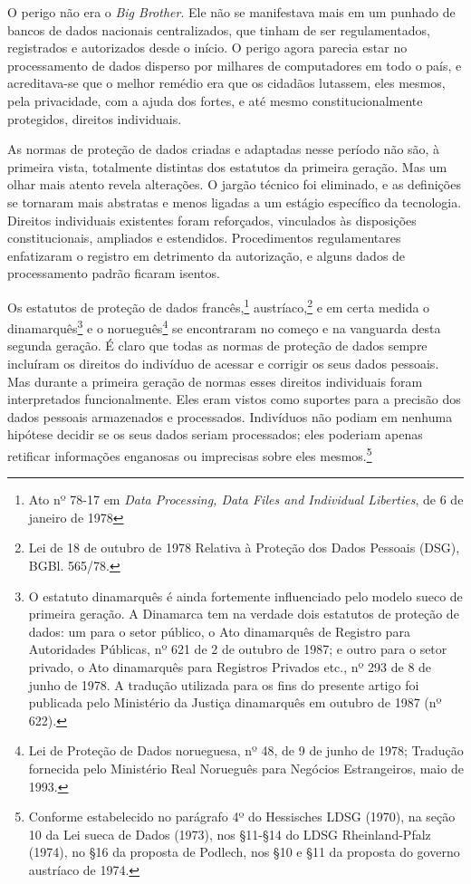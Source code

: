 O perigo não era o \emph{Big Brother}. Ele não se manifestava mais em um
punhado de bancos de dados nacionais centralizados, que tinham de ser
regulamentados, registrados e autorizados desde o início. O perigo agora
parecia estar no processamento de dados disperso por milhares de
computadores em todo o país, e acreditava-se que o melhor remédio era
que os cidadãos lutassem, eles mesmos, pela privacidade, com a ajuda dos
fortes, e até mesmo constitucionalmente protegidos, direitos
individuais.

As normas de proteção de dados criadas e adaptadas nesse período não
são, à primeira vista, totalmente distintas dos estatutos da primeira
geração. Mas um olhar mais atento revela alterações. O jargão técnico
foi eliminado, e as definições se tornaram mais abstratas e menos
ligadas a um estágio específico da tecnologia. Direitos individuais
existentes foram reforçados, vinculados às disposições constitucionais,
ampliados e estendidos. Procedimentos regulamentares enfatizaram o
registro em detrimento da autorização, e alguns dados de processamento
padrão ficaram isentos.

Os estatutos de proteção de dados francês,\footnote{Ato nº 78-17 em
  \emph{Data Processing, Data Files and Individual Liberties}, de 6 de
  janeiro de 1978} austríaco,\footnote{Lei de 18 de outubro de 1978
  Relativa à Proteção dos Dados Pessoais (DSG), BGBl. 565/78.} e em
certa medida o dinamarquês\footnote{O estatuto dinamarquês é ainda
  fortemente influenciado pelo modelo sueco de primeira geração. A
  Dinamarca tem na verdade dois estatutos de proteção de dados: um para
  o setor público, o Ato dinamarquês de Registro para Autoridades
  Públicas, nº 621 de 2 de outubro de 1987; e outro para o setor
  privado, o Ato dinamarquês para Registros Privados etc., nº 293 de 8
  de junho de 1978. A tradução utilizada para os fins do presente artigo
  foi publicada pelo Ministério da Justiça dinamarquês em outubro de
  1987 (nº 622).} e o norueguês\footnote{Lei de Proteção de Dados
  norueguesa, nº 48, de 9 de junho de 1978; Tradução fornecida pelo
  Ministério Real Norueguês para Negócios Estrangeiros, maio de 1993.}
se encontraram no começo e na vanguarda desta segunda geração. É claro
que todas as normas de proteção de dados sempre incluíram os direitos do
indivíduo de acessar e corrigir os seus dados pessoais. Mas durante a
primeira geração de normas esses direitos individuais foram
interpretados funcionalmente. Eles eram vistos como suportes para a
precisão dos dados pessoais armazenados e processados. Indivíduos não
podiam em nenhuma hipótese decidir se os seus dados seriam processados;
eles poderiam apenas retificar informações enganosas ou imprecisas sobre
eles mesmos.\footnote{Conforme estabelecido no parágrafo 4º do
  Hessisches LDSG (1970), na seção 10 da Lei sueca de Dados (1973), nos
  §11-§14 do LDSG Rheinland-Pfalz (1974), no §16 da proposta de Podlech,
  nos §10 e §11 da proposta do governo austríaco de 1974.}

